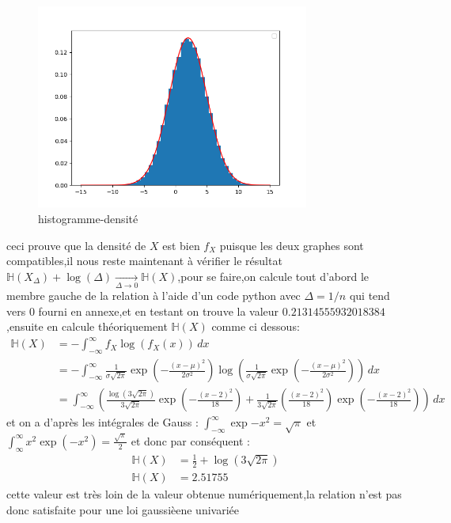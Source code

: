 \documentclass[a4paper]{article}
\begin{document}
\begin{figure}[h]
  \centering
  \includegraphics[width=0.8\textwidth]{Figure_1.png}
  \caption{histogramme-densité}
\end{figure}
ceci prouve que la densité de $X$ est bien $f_X$ puisque les deux graphes sont compatibles,il nous reste maintenant à vérifier le résultat$\mathbb{H}(X_\Delta)+\log(\Delta)\underset{\Delta \rightarrow 0}{\rightarrow}\mathbb{H}(X)$,pour se faire,on calcule tout d'abord le membre gauche de la relation à l'aide d'un code python avec $\Delta=1/n$ qui tend vers 0 fourni en annexe,et en testant on trouve la valeur $0.21314555932018384$,ensuite en calcule théoriquement $\mathbb{H}(X)$ comme ci dessous:
\begin{align*}
  \mathbb{H}(X) &= -\int_{-\infty}^{\infty}f_{X}\log(f_X(x))\,dx \\
  &= -\int_{-\infty}^{\infty}\frac{1}{\sigma\sqrt{2\pi}}\exp\left(-\frac{(x-\mu)^{2}}{2\sigma^2}\right)\log\left(\frac{1}{\sigma\sqrt{2\pi}}\exp\left(-\frac{(x-\mu)^{2}}{2\sigma^2}\right)\right)\,dx \\
  &= \int_{-\infty}^{\infty}\left(\frac{\log(3\sqrt{2\pi})}{3\sqrt{2\pi}}\exp\left(-\frac{(x-2)^2}{18}\right) + \frac{1}{3\sqrt{2\pi}}\left(\frac{(x-2)^2}{18}\right)\exp\left(-\frac{(x-2)^2}{18}\right)\right)\,dx
\end{align*}
et on a d'après les intégrales de Gauss : $\int_{-\infty}^{\infty}\exp{-x^2}=\sqrt{\pi}$ et $\int_{\infty}^{\infty}x^2\exp(-x^2)=\frac{\sqrt{\pi}}{2}$ et donc par conséquent : 
\begin{align*}
  \mathbb{H}(X) &= \frac{1}{2}+\log(3\sqrt{2\pi})\\
  \mathbb{H}(X) &= 2.51755
\end{align*}
cette valeur est très loin de la valeur obtenue numériquement,la relation n'est pas donc satisfaite pour une loi gaussièene univariée
\end{document}
